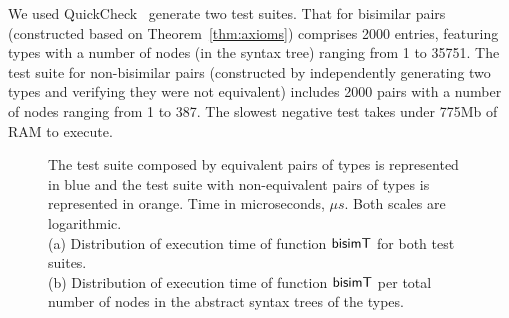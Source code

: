 We used QuickCheck~\cite{DBLP:conf/icfp/ClaessenH00} generate two test
suites. That for bisimilar pairs (constructed based on
Theorem~\ref{thm:axioms}) comprises 2000 entries, featuring types with
a number of nodes (in the syntax tree) ranging from 1 to 35751. The
test suite for non-bisimilar pairs (constructed by independently
generating two types and verifying they were not equivalent) includes
2000 pairs with a number of nodes ranging from 1 to 387.
%
The slowest negative test takes under 775Mb of RAM to execute.

\begin{figure}[t]
    \centering
    \caption{The test suite composed by equivalent pairs of types is represented in blue and the
    test suite with non-equivalent pairs of types is represented in orange. Time 
    in microseconds, $\mu s$. Both scales are logarithmic.\\
    (a) Distribution of execution time of function $\mathsf{bisimT}$ for both test suites.\\
    (b) Distribution of execution time of function $\mathsf{bisimT}$ per total number of nodes 
    in the abstract syntax trees of the types.}%
    \label{fig:results}%
\end{figure}

